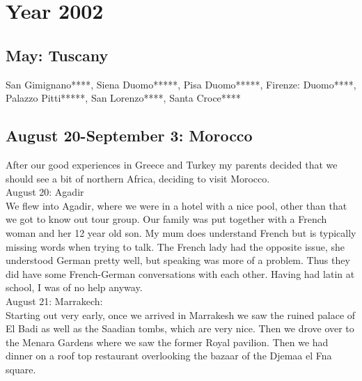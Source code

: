 \chapter{Year 2002}
\label{2002}

\section{May: Tuscany}
\label{2002:Tuscany}


San Gimignano****, Siena Duomo*****, Pisa Duomo*****, Firenze: Duomo****, Palazzo Pitti*****, San Lorenzo****, Santa Croce****

\section{August 20-September 3: Morocco}
\label{2002:Morocco}


After our good experiences in Greece and Turkey my parents decided that we should see a bit of northern Africa, deciding to visit Morocco.\\

August 20: Agadir\\
We flew into Agadir, where we were in a hotel with a nice pool, other than that we got to know out tour group. Our family was put together with a French woman and her 12 year old son. My mum does understand French but is typically missing words when trying to talk. The French lady had the opposite issue, she understood German pretty well, but speaking was more of a problem. Thus they did have some French-German conversations with each other. Having had latin at school, I was of no help anyway.\\

August 21: Marrakech:\\
Starting out very early, once we arrived in Marrakesh we saw the ruined palace of El Badi as well as the Saadian tombs, which are very nice. Then we drove over to the Menara Gardens where we saw the former Royal pavilion. Then we had dinner on a roof top restaurant overlooking the bazaar of the Djemaa el Fna square.\\

